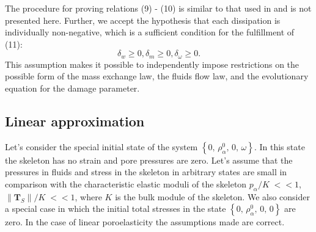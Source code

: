 \documentclass[article,authoryear,jpm]{beg_39}             %
\begin{document}
The procedure for proving relations (9) - (10) is similar to that used in \cite{Truesdell, Kondaurov2007} and is not presented here.
Further, we accept the hypothesis that each dissipation is individually non-negative, which is a sufficient condition for the fulfillment of (11):
\begin{equation}
{{\delta }_{w}}\ge 0, {{\delta }_{m}}\ge 0, {{\delta }_{\omega }}\ge 0.
\end{equation}
This assumption makes it possible to independently impose restrictions on the possible form of the mass exchange law, the fluids flow law, and the evolutionary equation for the damage parameter.
\subsection{Linear approximation}
Let’s consider the special initial state of the system
$\left\{ 0,\,\rho _{\alpha }^{0},\,0,\,\omega \right\}$.
In this state the skeleton has no strain and pore pressures are zero.
Let’s assume that the pressures in fluids and stress in the skeleton in arbitrary states are small in comparison with the characteristic elastic moduli of the skeleton
${{{p}_{\alpha }}}/{K}\;<<1$, ${\left\| {{\mathbf{T}}_{S}} \right\|}/{K}\;<<1$,
where $K$ is the bulk module of the skeleton. We also consider a special case in which the initial total stresses in the state
$\left\{ 0,\,\rho _{\alpha }^{0},\,0,\,0 \right\}$
are zero. In the case of linear poroelasticity the assumptions made are correct.
\end{document}
